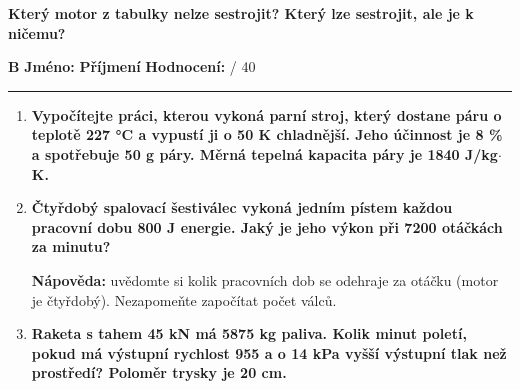 \documentclass[../main.tex]{subfiles}
\begin{document}
\begin{enumerate}[label={\textbf{\arabic*.}}]
\begin{minipage}[t]{0.4\textwidth}
    \item \textbf{Který motor z tabulky nelze sestrojit? Který lze sestrojit, ale je k ničemu?}\vspace{0.2cm}\\
        \tecky{7.75cm}
        \tecky{7.75cm}

\end{minipage}

\end{enumerate}

\newpage
\textbf{B}
\hspace{1cm}
\textbf{Jméno:}
\tecky{4cm}
\hspace{0.25cm}
\textbf{Příjmení}
\tecky{4cm}
\hfill
\textbf{Hodnocení:}
\tecky{0.5cm}
{/}
{40}
\vspace{0.25cm}
\hrule
\vspace{0.25cm}

\begin{enumerate}[label={\textbf{\arabic*.}}, resume]

    \item \textbf{Vypočítejte práci, kterou vykoná parní stroj, který dostane páru o teplotě 227 °C a vypustí ji o 50 K chladnější. Jeho účinnost je 8 \% a spotřebuje 50 g páry. Měrná tepelná kapacita páry je 1840 J/kg\(\cdot\)K.}

    \vspace{5.5cm}
    
    \dotfill
    
    \item \textbf{Čtyřdobý spalovací šestiválec vykoná jedním pístem každou pracovní dobu 800 J energie. Jaký je jeho výkon při 7200 otáčkách za minutu?}

    \vspace{5.5cm}
    
    \dotfill\odst
    \begin{minipage}{0.7\textwidth}
        \small{\textbf{Nápověda: }uvědomte si kolik pracovních dob se odehraje za otáčku (motor je čtyřdobý). Nezapomeňte započítat počet válců.}
    \end{minipage}
    \hfill
    \begin{minipage}{0.25\textwidth}
    \end{minipage}

    \item \textbf{Raketa s tahem 45 kN má 5875 kg paliva. Kolik minut poletí, pokud má výstupní rychlost 955 \ms a o 14 kPa vyšší výstupní tlak než prostředí? Poloměr trysky je 20 cm.}

    \vspace{5.5cm}
    
    \dotfill
\end{enumerate}
\end{document}
